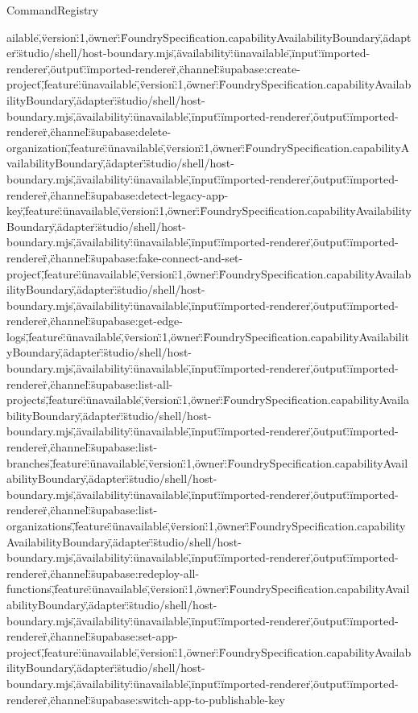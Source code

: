 \begin{lexlean}{CommandRegistry}
\begin{semanticmodule}
{ailable\",\"version\":1,\"owner\":\"FoundrySpecification.capabilityAvailabilityBoundary\",\"adapter\":\"studio/shell/host-boundary.mjs\",\"availability\":\"unavailable\",\"input\":\"imported-renderer\",\"output\":\"imported-renderer\"},{\"channel\":\"supabase:create-project\",\"feature\":\"unavailable\",\"version\":1,\"owner\":\"FoundrySpecification.capabilityAvailabilityBoundary\",\"adapter\":\"studio/shell/host-boundary.mjs\",\"availability\":\"unavailable\",\"input\":\"imported-renderer\",\"output\":\"imported-renderer\"},{\"channel\":\"supabase:delete-organization\",\"feature\":\"unavailable\",\"version\":1,\"owner\":\"FoundrySpecification.capabilityAvailabilityBoundary\",\"adapter\":\"studio/shell/host-boundary.mjs\",\"availability\":\"unavailable\",\"input\":\"imported-renderer\",\"output\":\"imported-renderer\"},{\"channel\":\"supabase:detect-legacy-app-key\",\"feature\":\"unavailable\",\"version\":1,\"owner\":\"FoundrySpecification.capabilityAvailabilityBoundary\",\"adapter\":\"studio/shell/host-boundary.mjs\",\"availability\":\"unavailable\",\"input\":\"imported-renderer\",\"output\":\"imported-renderer\"},{\"channel\":\"supabase:fake-connect-and-set-project\",\"feature\":\"unavailable\",\"version\":1,\"owner\":\"FoundrySpecification.capabilityAvailabilityBoundary\",\"adapter\":\"studio/shell/host-boundary.mjs\",\"availability\":\"unavailable\",\"input\":\"imported-renderer\",\"output\":\"imported-renderer\"},{\"channel\":\"supabase:get-edge-logs\",\"feature\":\"unavailable\",\"version\":1,\"owner\":\"FoundrySpecification.capabilityAvailabilityBoundary\",\"adapter\":\"studio/shell/host-boundary.mjs\",\"availability\":\"unavailable\",\"input\":\"imported-renderer\",\"output\":\"imported-renderer\"},{\"channel\":\"supabase:list-all-projects\",\"feature\":\"unavailable\",\"version\":1,\"owner\":\"FoundrySpecification.capabilityAvailabilityBoundary\",\"adapter\":\"studio/shell/host-boundary.mjs\",\"availability\":\"unavailable\",\"input\":\"imported-renderer\",\"output\":\"imported-renderer\"},{\"channel\":\"supabase:list-branches\",\"feature\":\"unavailable\",\"version\":1,\"owner\":\"FoundrySpecification.capabilityAvailabilityBoundary\",\"adapter\":\"studio/shell/host-boundary.mjs\",\"availability\":\"unavailable\",\"input\":\"imported-renderer\",\"output\":\"imported-renderer\"},{\"channel\":\"supabase:list-organizations\",\"feature\":\"unavailable\",\"version\":1,\"owner\":\"FoundrySpecification.capabilityAvailabilityBoundary\",\"adapter\":\"studio/shell/host-boundary.mjs\",\"availability\":\"unavailable\",\"input\":\"imported-renderer\",\"output\":\"imported-renderer\"},{\"channel\":\"supabase:redeploy-all-functions\",\"feature\":\"unavailable\",\"version\":1,\"owner\":\"FoundrySpecification.capabilityAvailabilityBoundary\",\"adapter\":\"studio/shell/host-boundary.mjs\",\"availability\":\"unavailable\",\"input\":\"imported-renderer\",\"output\":\"imported-renderer\"},{\"channel\":\"supabase:set-app-project\",\"feature\":\"unavailable\",\"version\":1,\"owner\":\"FoundrySpecification.capabilityAvailabilityBoundary\",\"adapter\":\"studio/shell/host-boundary.mjs\",\"availability\":\"unavailable\",\"input\":\"imported-renderer\",\"output\":\"imported-renderer\"},{\"channel\":\"supabase:switch-app-to-publishable-key}
\end{semanticmodule}
\end{lexlean}
